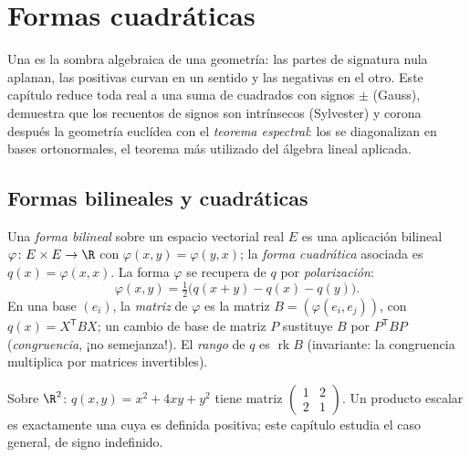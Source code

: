 \chapter{Formas cuadráticas}\label{ch:b2:quadratic}

Una  es la sombra algebraica de una geometría: las
partes de signatura nula aplanan, las positivas curvan en un sentido y
las negativas en el otro. Este capítulo reduce toda 
real a una suma de cuadrados con signos $\pm$ (Gauss), demuestra que los
recuentos de signos son intrínsecos (Sylvester) y corona después la
geometría euclídea con el \emph{teorema espectral}: los
 se diagonalizan en bases ortonormales, el
teorema más utilizado del álgebra lineal aplicada.

\section{Formas bilineales y cuadráticas}

\begin{definition}\label{def:b2:quadratic:def}
Una \emph{forma bilineal } sobre un espacio vectorial real
$E$ es una aplicación bilineal $\varphi \colon E \times E \to \R$
con $\varphi(x, y) = \varphi(y, x)$; la \emph{forma cuadrática}
asociada es $q(x) = \varphi(x, x)$. La forma
$\varphi$ se recupera de $q$ por
\emph{polarización}:
\[
\varphi(x, y) = \tfrac12\bigl(q(x + y) - q(x) - q(y)\bigr).
\]
En una base $(e_i)$, la \emph{matriz} de $\varphi$ es la matriz
 $B = (\varphi(e_i, e_j))$, con $q(x) = X^{\mathsf T} B
X$; un cambio de base de matriz $P$ sustituye $B$ por $P^{\mathsf T}
B P$ (\emph{congruencia}, ¡no
semejanza!). El \emph{rango} de $q$ es $\operatorname{rk} B$
(invariante: la congruencia multiplica por matrices invertibles).
\end{definition}

\begin{example}
Sobre $\R^2$: $q(x, y) = x^2 + 4xy + y^2$ tiene matriz
$\begin{pmatrix} 1 & 2\\ 2 & 1\end{pmatrix}$. Un producto escalar es
exactamente una  cuya  es
definida positiva; este capítulo estudia el caso general, de signo
indefinido.
\end{example}

